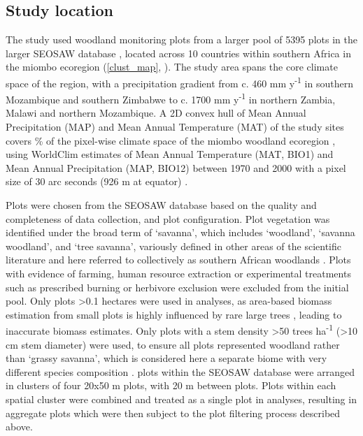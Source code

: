 \documentclass[11pt,a4paper]{article}
\begin{document}
\subsection{Study location}

The study used \nplots{} woodland monitoring plots from a larger pool of 5395 plots in the larger SEOSAW database \citep{SEOSAW2020}, located across 10 countries within southern Africa in the miombo ecoregion (\autoref{clust_map}, \citealp{White1987}). The study area spans the core climate space of the region, with a precipitation gradient from c. 460 mm y\textsuperscript{-1} in southern Mozambique and southern Zimbabwe to c. 1700 mm y\textsuperscript{-1} in northern Zambia, Malawi and northern Mozambique. A 2D convex hull of Mean Annual Precipitation (MAP) and Mean Annual Temperature (MAT) of the study sites covers \hullcover{}\% of the pixel-wise climate space of the miombo woodland ecoregion \citep{White1987}, using WorldClim estimates of Mean Annual Temperature (MAT, BIO1) and Mean Annual Precipitation (MAP, BIO12) between 1970 and 2000 with a pixel size of 30 arc seconds (926 m at equator) \citep{Fick2017}. 

Plots were chosen from the SEOSAW database based on the quality and completeness of data collection, and plot configuration. Plot vegetation was identified under the broad term of `savanna', which includes `woodland', `savanna woodland', and `tree savanna', variously defined in other areas of the scientific literature and here referred to collectively as southern African woodlands \citep{Ratnam2011, Hill2010}. Plots with evidence of farming, human resource extraction or experimental treatments such as prescribed burning or herbivore exclusion were excluded from the initial pool. Only plots >0.1 hectares were used in analyses, as area-based biomass estimation from small plots is highly influenced by rare large trees \citep{Stegen2011}, leading to inaccurate biomass estimates. Only plots with a stem density >50 trees ha\textsuperscript{-1} (>10 cm stem diameter) were used, to ensure all plots represented woodland rather than `grassy savanna', which is considered here a separate biome with very different species composition \citep{Parr2014}. \nzam{} plots within the SEOSAW database were arranged in clusters of four 20x50 m plots, with 20 m between plots. Plots within each spatial cluster were combined and treated as a single plot in analyses, resulting in \nzamcluster{} aggregate plots which were then subject to the plot filtering process described above.
\end{document}
